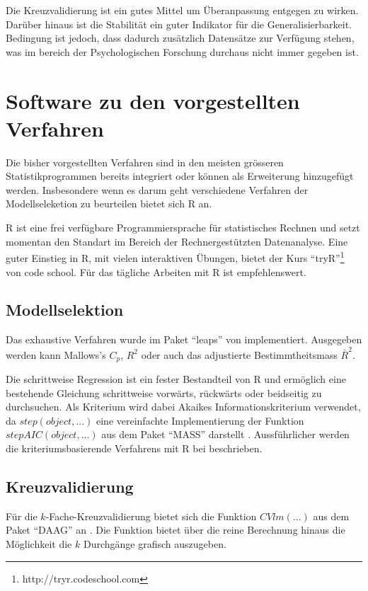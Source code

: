 \documentclass[english,12pt,doc]{apa}
\begin{document}
Die Kreuzvalidierung ist ein gutes Mittel um Überanpassung entgegen zu wirken.
Darüber hinaus ist die Stabilität ein guter Indikator für die Generalisierbarkeit.
Bedingung ist jedoch, dass dadurch zusätzlich Datensätze zur Verfügung stehen, was im bereich der Psychologischen Forschung durchaus nicht immer gegeben ist.

\section{Software zu den vorgestellten Verfahren}
Die bisher vorgestellten Verfahren sind in den meisten grösseren Statistikprogrammen bereits integriert oder können als Erweiterung hinzugefügt werden.
Insbesondere wenn es darum geht verschiedene Verfahren der Modellseleketion zu beurteilen bietet sich R an.

R ist eine frei verfügbare Programmiersprache für statistisches Rechnen und setzt momentan den Standart im Bereich der Rechnergestützten Datenanalyse. 
Eine guter Einstieg in R, mit vielen interaktiven Übungen, bietet der Kurs ``tryR''\footnote{http://tryr.codeschool.com} von code school.
Für das tägliche Arbeiten mit R ist   empfehlenswert.

\subsection{Modellselektion}
Das exhaustive Verfahren wurde im Paket ``leaps'' von  implementiert. 
Ausgegeben werden kann Mallows's $C_p$, $R^2$ oder auch das adjustierte Bestimmtheitsmass $\bar R^2$.

Die schrittweise Regression ist ein fester Bestandteil von R \cite{R:core} und ermöglich eine bestehende Gleichung schrittweise vorwärts, rückwärts oder beidseitig zu durchsuchen.
Als Kriterium wird dabei Akaikes Informationskriterium verwendet, da $step(object, ...)$ eine vereinfachte Implementierung der Funktion $stepAIC(object, ...)$  aus dem Paket ``MASS'' darstellt \cite{R:MASS}. 
Aussführlicher werden die kriteriumsbasierende Verfahrens mit R bei  beschrieben.

\subsection{Kreuzvalidierung}
Für die $k$-Fache-Kreuzvalidierung bietet sich die Funktion $CVlm(...)$ aus dem Paket ``DAAG'' an \cite{R:DAAG}. 
Die Funktion bietet über die reine Berechnung hinaus die Möglichkeit die $k$ Durchgänge grafisch auszugeben.
\end{document}
